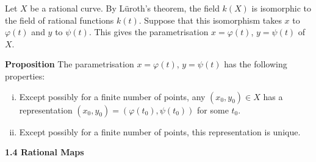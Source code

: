 \documentclass[hidelinks, 12pt]{article}
\theoremstyle{mydefstyle}
\theoremstyle{mythmstyle}
\newcounter{prop}
\begin{document}
Let $X$ be a rational curve. By L{\"u}roth's theorem, the field $k(X)$ is isomorphic to the field of rational functions $k(t)$. Suppose that this isomorphism takes $x$ to $\varphi(t)$ and $y$ to $\psi(t)$. This gives the parametrisation $x = \varphi(t)$, $y = \psi(t)$ of $X$.

\textbf{Proposition} The parametrisation $x = \varphi(t)$, $y = \psi(t)$ has the following properties:
\begin{enumerate}[(i)]
\item Except possibly for a finite number of points, any $(x_0, y_0) \in X$ has a representation $(x_0, y_0) = (\varphi(t_0), \psi(t_0))$ for some $t_0$.
\item Except possibly for a finite number of points, this representation is unique. 
\end{enumerate}

\textbf{1.4 Rational Maps}
\end{document}
